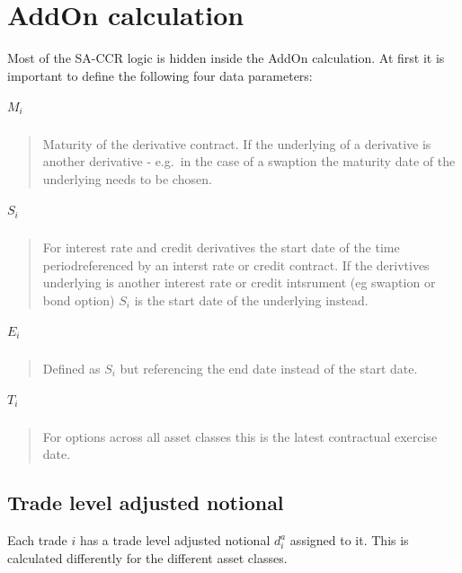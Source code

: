     

    
    \hypertarget{addon-calculation}{%
\section{AddOn calculation}\label{addon-calculation}}

Most of the SA-CCR logic is hidden inside the AddOn calculation. At
first it is important to define the following four data parameters:

\hypertarget{m_i}{%
\subparagraph{\texorpdfstring{\(M_i\)}{M\_i}}\label{m_i}}

\begin{quote}
Maturity of the derivative contract. If the underlying of a derivative
is another derivative - e.g.~in the case of a swaption the maturity date
of the underlying needs to be chosen.
\end{quote}

\hypertarget{s_i}{%
\subparagraph{\texorpdfstring{\(S_i\)}{S\_i}}\label{s_i}}

\begin{quote}
For interest rate and credit derivatives the start date of the time
periodreferenced by an interst rate or credit contract. If the
derivtives underlying is another interest rate or credit intsrument (eg
swaption or bond option) \(S_i\) is the start date of the underlying
instead.
\end{quote}

\hypertarget{e_i}{%
\subparagraph{\texorpdfstring{\(E_i\)}{E\_i}}\label{e_i}}

\begin{quote}
Defined as \(S_i\) but referencing the end date instead of the start
date.
\end{quote}

\hypertarget{t_i}{%
\subparagraph{\texorpdfstring{\(T_i\)}{T\_i}}\label{t_i}}

\begin{quote}
For options across all asset classes this is the latest contractual
exercise date.
\end{quote}

    \hypertarget{trade-level-adjusted-notional}{%
\subsection{Trade level adjusted
notional}\label{trade-level-adjusted-notional}}

Each trade \(i\) has a trade level adjusted notional \(d_i^a\) assigned
to it. This is calculated differently for the different asset classes.


